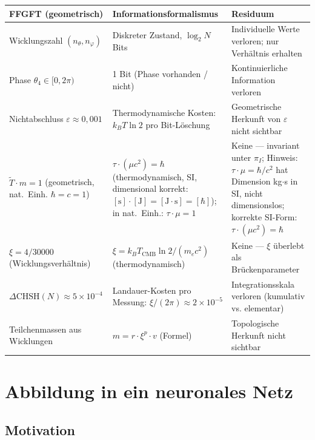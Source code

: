 \begin{center}
\renewcommand{\arraystretch}{1.4}
{\small
\begin{tabular}{p{5.2cm}p{6.0cm}p{5.2cm}}
\toprule
\textbf{FFGFT (geometrisch)} & \textbf{Informationsformalismus} & \textbf{Residuum} \\
\midrule
Wicklungszahl $(n_\theta, n_\varphi)$
  & Diskreter Zustand, $\log_2 N$ Bits
  & Individuelle Werte verloren; nur Verhältnis erhalten \\[4pt]
Phase $\theta_4 \in [0, 2\pi)$
  & 1 Bit (Phase vorhanden / nicht)
  & Kontinuierliche Information verloren \\[4pt]
Nichtabschluss $\varepsilon \approx 0{,}001$
  & Thermodynamische Kosten: $k_B T \ln 2$ pro Bit-Löschung
  & Geometrische Herkunft von $\varepsilon$ nicht sichtbar \\[4pt]
$\tilde{T} \cdot m = 1$ (geometrisch, nat.\ Einh. $\hbar=c=1$)
  & $\tau \cdot (\mu c^2) = \hbar$ (thermodynamisch, SI,
    dimensional korrekt: $[\text{s}]\cdot[\text{J}]=[\text{J}\cdot\text{s}]=[\hbar]$);
    in nat.\ Einh.: $\tau\cdot\mu = 1$
  & Keine --- invariant unter $\pi_I$;
    Hinweis: $\tau\cdot\mu=\hbar/c^2$ hat Dimension kg$\cdot$s in SI,
    nicht dimensionslos; korrekte SI-Form: $\tau\cdot(\mu c^2)=\hbar$ \\[4pt]
$\xi = 4/30000$ (Wicklungsverhältnis)
  & $\xi = k_B T_\text{CMB} \ln 2 / (m_e c^2)$ (thermodynamisch)
  & Keine --- $\xi$ überlebt als Brückenparameter \\[4pt]
$\Delta\text{CHSH}(N) \approx 5 \times 10^{-4}$
  & Landauer-Kosten pro Messung: $\xi/(2\pi) \approx 2 \times 10^{-5}$
  & Integrationsskala verloren (kumulativ vs. elementar) \\[4pt]
Teilchenmassen aus Wicklungen
  & $m = r \cdot \xi^p \cdot v$ (Formel)
  & Topologische Herkunft nicht sichtbar \\[4pt]
\bottomrule
\end{tabular}
}
\end{center}

\section{Abbildung in ein neuronales Netz}

\subsection{Motivation}

